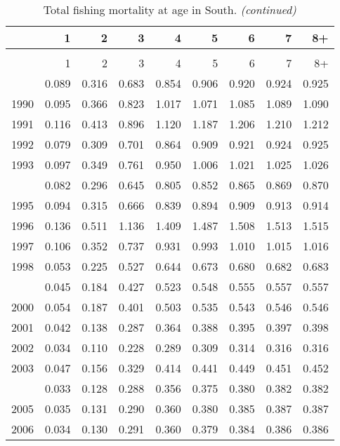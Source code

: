 \documentclass[
]{article}
\begin{document}
\begin{longtable}[t]{lrrrrrrrr}
\caption{\label{tab:South-region-FAA-table}Total fishing mortality at age in South.}\\
\toprule
  & 1 & 2 & 3 & 4 & 5 & 6 & 7 & 8+\\
\midrule
\endfirsthead
\caption[]{Total fishing mortality at age in South. \textit{(continued)}}\\
\toprule
  & 1 & 2 & 3 & 4 & 5 & 6 & 7 & 8+\\
\midrule
\endhead

\endfoot
\bottomrule
\endlastfoot
1989 & 0.089 & 0.316 & 0.683 & 0.854 & 0.906 & 0.920 & 0.924 & 0.925\\
1990 & 0.095 & 0.366 & 0.823 & 1.017 & 1.071 & 1.085 & 1.089 & 1.090\\
1991 & 0.116 & 0.413 & 0.896 & 1.120 & 1.187 & 1.206 & 1.210 & 1.212\\
1992 & 0.079 & 0.309 & 0.701 & 0.864 & 0.909 & 0.921 & 0.924 & 0.925\\
1993 & 0.097 & 0.349 & 0.761 & 0.950 & 1.006 & 1.021 & 1.025 & 1.026\\
\addlinespace
1994 & 0.082 & 0.296 & 0.645 & 0.805 & 0.852 & 0.865 & 0.869 & 0.870\\
1995 & 0.094 & 0.315 & 0.666 & 0.839 & 0.894 & 0.909 & 0.913 & 0.914\\
1996 & 0.136 & 0.511 & 1.136 & 1.409 & 1.487 & 1.508 & 1.513 & 1.515\\
1997 & 0.106 & 0.352 & 0.737 & 0.931 & 0.993 & 1.010 & 1.015 & 1.016\\
1998 & 0.053 & 0.225 & 0.527 & 0.644 & 0.673 & 0.680 & 0.682 & 0.683\\
\addlinespace
1999 & 0.045 & 0.184 & 0.427 & 0.523 & 0.548 & 0.555 & 0.557 & 0.557\\
2000 & 0.054 & 0.187 & 0.401 & 0.503 & 0.535 & 0.543 & 0.546 & 0.546\\
2001 & 0.042 & 0.138 & 0.287 & 0.364 & 0.388 & 0.395 & 0.397 & 0.398\\
2002 & 0.034 & 0.110 & 0.228 & 0.289 & 0.309 & 0.314 & 0.316 & 0.316\\
2003 & 0.047 & 0.156 & 0.329 & 0.414 & 0.441 & 0.449 & 0.451 & 0.452\\
\addlinespace
2004 & 0.033 & 0.128 & 0.288 & 0.356 & 0.375 & 0.380 & 0.382 & 0.382\\
2005 & 0.035 & 0.131 & 0.290 & 0.360 & 0.380 & 0.385 & 0.387 & 0.387\\
2006 & 0.034 & 0.130 & 0.291 & 0.360 & 0.379 & 0.384 & 0.386 & 0.386\\

\end{longtable}
\end{document}
